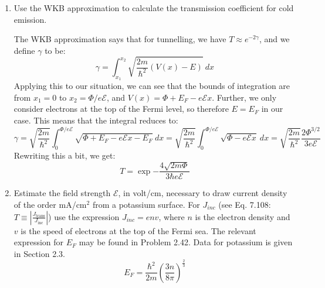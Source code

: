 \documentclass[10pt]{article}
\begin{document}
	\begin{enumerate}[label=\alph*)]
		\item  Use the WKB approximation to calculate the transmission coefficient for cold emission.

			\begin{solution}
				The WKB approximation says that for tunnelling, we have $T \approx e^{-2 \gamma}$, and we 
				define $\gamma$ to be:
				\[
					\gamma = \int_{x_1}^{x_2} \sqrt{\frac{2m}{\hbar^2}\left(V(x) - E\right)}\  dx
				\] 
				Applying this to our situation, we can see that the bounds of integration are from $x_1 = 0$ to
				$x_2 = \Phi/e \mathcal E$, and $V(x) = \Phi + E_F - e \mathcal E x$. Further, we only consider
				electrons at the top of the Fermi level, so therefore $E = E_F$ in our case. This means that the
				integral reduces to: 
				\[
					\gamma = \sqrt{\frac{2m}{\hbar^2}} \int_{0}^{\Phi/e\mathcal E} \sqrt{\Phi + E_F
					- e \mathcal E x - E_F} \ dx = \sqrt{\frac{2m}{\hbar^2}} \int_{0}^{\Phi/e\mathcal E}
					\sqrt{\Phi - e\mathcal E x} \  dx = \sqrt{\frac{2m}{\hbar^2}} 
					\frac{2 \Phi^{3/2}}{3e\mathcal E}
				\] 
				Rewriting this a bit, we get: 
				\[
					T = \exp{-\frac{4\sqrt{2m \Phi}}{3 \hbar e \mathcal E}}
				\] 

			\end{solution}
		\item Estimate the field strength $\mathcal E$, in volt/cm, necessary to draw current density of the 
			order mA/$\text{cm}^2$ from a potassium surface. For $J_{inc}$ (see Eq. 7.108:
			$T \equiv \left|\frac{J_{\text{trans}}}{J_{\text{inc}}}\right|$) use the expression 
			$J_{inc} =
			env$, where $n$ is the electron density and $v$ is the speed of electrons at the top of the Fermi
			sea. The relevant expression for $E_F$ may be found in Problem 2.42. Data for potassium is given 
			in Section 2.3.
			\[
				E_F = \frac{\hbar^2}{2m}\left( \frac{3n}{8\pi} \right)^{\frac{2}{3}}
			\] 



\end{enumerate}
\end{document}
